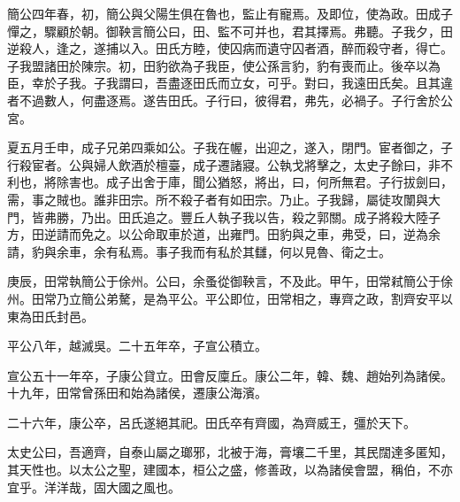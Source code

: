 簡公四年春，初，簡公與父陽生俱在魯也，監止有寵焉。及即位，使為政。田成子憚之，驟顧於朝。御鞅言簡公曰，田、監不可并也，君其擇焉。弗聽。子我夕，田逆殺人，逢之，遂捕以入。田氏方睦，使囚病而遺守囚者酒，醉而殺守者，得亡。子我盟諸田於陳宗。初，田豹欲為子我臣，使公孫言豹，豹有喪而止。後卒以為臣，幸於子我。子我謂曰，吾盡逐田氏而立女，可乎。對曰，我遠田氏矣。且其違者不過數人，何盡逐焉。遂告田氏。子行曰，彼得君，弗先，必禍子。子行舍於公宮。

夏五月壬申，成子兄弟四乘如公。子我在幄，出迎之，遂入，閉門。宦者御之，子行殺宦者。公與婦人飲酒於檀臺，成子遷諸寢。公執戈將擊之，太史子餘曰，非不利也，將除害也。成子出舍于庫，聞公猶怒，將出，曰，何所無君。子行拔劍曰，需，事之賊也。誰非田宗。所不殺子者有如田宗。乃止。子我歸，屬徒攻闈與大門，皆弗勝，乃出。田氏追之。豐丘人執子我以告，殺之郭關。成子將殺大陸子方，田逆請而免之。以公命取車於道，出雍門。田豹與之車，弗受，曰，逆為余請，豹與余車，余有私焉。事子我而有私於其讎，何以見魯、衛之士。

庚辰，田常執簡公于俆州。公曰，余蚤從御鞅言，不及此。甲午，田常弒簡公于俆州。田常乃立簡公弟驁，是為平公。平公即位，田常相之，專齊之政，割齊安平以東為田氏封邑。

平公八年，越滅吳。二十五年卒，子宣公積立。

宣公五十一年卒，子康公貸立。田會反廩丘。康公二年，韓、魏、趙始列為諸侯。十九年，田常曾孫田和始為諸侯，遷康公海濱。

二十六年，康公卒，呂氏遂絕其祀。田氏卒有齊國，為齊威王，彊於天下。

太史公曰，吾適齊，自泰山屬之瑯邪，北被于海，膏壤二千里，其民闊達多匿知，其天性也。以太公之聖，建國本，桓公之盛，修善政，以為諸侯會盟，稱伯，不亦宜乎。洋洋哉，固大國之風也。